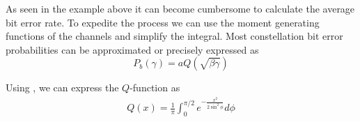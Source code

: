 \documentclass[12pt]{report} %
\begin{document}
As seen in the example above it can become cumbersome to calculate the average bit error rate. To expedite the process we can use the moment generating functions of the channels and simplify the integral. Most constellation bit error probabilities can be approximated or precisely expressed as $$P_b(\gamma) = a Q( \sqrt{\beta\gamma})$$

Using \cite{Craig258319}, we can express the $Q$-function as
\begin{align}
  Q(x) = \frac{1}{\pi}\int_{0}^{\pi/2} e^{-\frac{x^2}{2 \sin^2\phi}}d\phi
\end{align}

\printglossary[type=\acronymtype,title=Acronyms]



\end{document}
